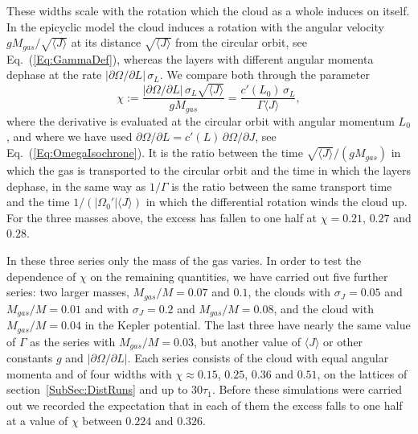 These widths scale with the rotation which the cloud as a whole induces on itself. In the epicyclic model the cloud induces a rotation with the angular velocity $g M_{gas}/\sqrt{\langle J\rangle}$ at its distance $\sqrt{\langle J\rangle}$ from the circular orbit, see Eq.~(\ref{Eq:GammaDef}), whereas the layers with different angular momenta dephase at the rate $|\partial\Omega/\partial L|\,\sigma_L$. We compare both through the parameter
\begin{equation}
\chi := \frac{|\partial\Omega/\partial L|\,\sigma_L\sqrt{\langle J\rangle}}{g M_{gas}} = \frac{c'(L_0)\,\sigma_L}{\Gamma \langle J\rangle},
\label{Eq:chi}
\end{equation}
where the derivative is evaluated at the circular orbit with angular momentum $L_0$, and where we have used $\partial\Omega/\partial L = c'(L)\,\partial\Omega/\partial J$, see Eq.~(\ref{Eq:OmegaIsochrone}). It is the ratio between the time $\sqrt{\langle J\rangle}/(g M_{gas})$ in which the gas is transported to the circular orbit and the time in which the layers dephase, in the same way as $1/\Gamma$ is the ratio between the same transport time and the time $1/(|\Omega_0'| \langle J\rangle)$ in which the differential rotation winds the cloud up. For the three masses above, the excess has fallen to one half at $\chi = 0.21$, $0.27$ and $0.28$.

In these three series only the mass of the gas varies. In order to test the dependence of $\chi$ on the remaining quantities, we have carried out five further series: two larger masses, $M_{gas}/M = 0.07$ and $0.1$, the clouds with $\sigma_J = 0.05$ and $M_{gas}/M = 0.01$ and with $\sigma_J = 0.2$ and $M_{gas}/M = 0.08$, and the cloud with $M_{gas}/M = 0.04$ in the Kepler potential. The last three have nearly the same value of $\Gamma$ as the series with $M_{gas}/M = 0.03$, but another value of $\langle J\rangle$ or other constants $g$ and $|\partial\Omega/\partial L|$. Each series consists of the cloud with equal angular momenta and of four widths with $\chi\approx 0.15$, $0.25$, $0.36$ and $0.51$, on the lattices of section~\ref{SubSec:DistRuns} and up to $30\tau_1$. Before these simulations were carried out we recorded the expectation that in each of them the excess falls to one half at a value of $\chi$ between $0.224$ and $0.326$.

